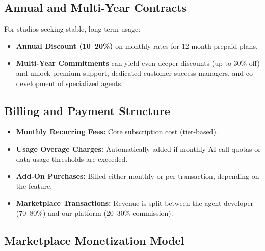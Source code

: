 \documentclass[11pt]{article}
\begin{document}
\subsection{Annual and Multi-Year Contracts}
For studios seeking stable, long-term usage:
\begin{itemize}
    \item \textbf{Annual Discount (10--20\%)} on monthly rates for 12-month prepaid plans.
    \item \textbf{Multi-Year Commitments} can yield even deeper discounts (up to 30\% off) and unlock premium support, dedicated customer success managers, and co-development of specialized agents.
\end{itemize}

\subsection{Billing and Payment Structure}
\begin{itemize}
    \item \textbf{Monthly Recurring Fees:} Core subscription cost (tier-based).
    \item \textbf{Usage Overage Charges:} Automatically added if monthly AI call quotas or data usage thresholds are exceeded.
    \item \textbf{Add-On Purchases:} Billed either monthly or per-transaction, depending on the feature.
    \item \textbf{Marketplace Transactions:} Revenue is split between the agent developer (70--80\%) and our platform (20--30\% commission).
\end{itemize}

\subsection{Marketplace Monetization Model}
\begin{table}[H]
\centering
{}
\caption{Agent Marketplace Revenue Share Model}
\end{table}
\end{document}
